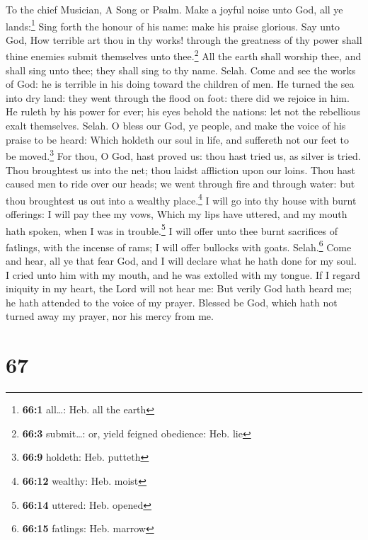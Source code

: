 To the chief Musician, A Song or Psalm.  Make a joyful
noise unto God, all ye lands:\footnote{\textbf{66:1} all\ldots: Heb. all
  the earth}  Sing forth the honour of his name: make his
praise glorious.  Say unto God, How terrible art thou in
thy works! through the greatness of thy power shall thine enemies submit
themselves unto thee.\footnote{\textbf{66:3} submit\ldots: or, yield
  feigned obedience: Heb. lie}  All the earth shall
worship thee, and shall sing unto thee; they shall sing to thy name.
Selah.  Come and see the works of God: he is terrible in
his doing toward the children of men.  He turned the sea
into dry land: they went through the flood on foot: there did we rejoice
in him.  He ruleth by his power for ever; his eyes behold
the nations: let not the rebellious exalt themselves. Selah.
 O bless our God, ye people, and make the voice of his
praise to be heard:  Which holdeth our soul in life, and
suffereth not our feet to be moved.\footnote{\textbf{66:9} holdeth: Heb.
  putteth}  For thou, O God, hast proved us: thou hast
tried us, as silver is tried.  Thou broughtest us into
the net; thou laidst affliction upon our loins.  Thou
hast caused men to ride over our heads; we went through fire and through
water: but thou broughtest us out into a wealthy place.\footnote{\textbf{66:12}
  wealthy: Heb. moist}  I will go into thy house with
burnt offerings: I will pay thee my vows,  Which my lips
have uttered, and my mouth hath spoken, when I was in
trouble.\footnote{\textbf{66:14} uttered: Heb. opened}  I
will offer unto thee burnt sacrifices of fatlings, with the incense of
rams; I will offer bullocks with goats. Selah.\footnote{\textbf{66:15}
  fatlings: Heb. marrow}  Come and hear, all ye that fear
God, and I will declare what he hath done for my soul.  I
cried unto him with my mouth, and he was extolled with my tongue.
 If I regard iniquity in my heart, the Lord will not hear
me:  But verily God hath heard me; he hath attended to
the voice of my prayer.  Blessed be God, which hath not
turned away my prayer, nor his mercy from me.

\hypertarget{section-66}{%
\section{67}\label{section-66}}

